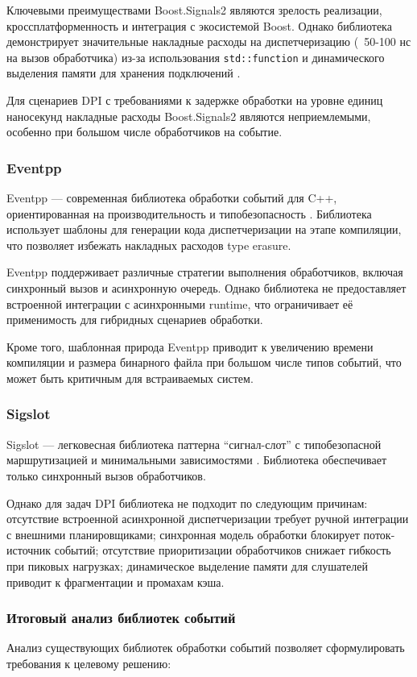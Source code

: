 Ключевыми преимуществами Boost.Signals2 являются зрелость реализации, кроссплатформенность и интеграция с экосистемой Boost.
Однако библиотека демонстрирует значительные накладные расходы на диспетчеризацию (~50-100 нс на вызов обработчика) из-за использования \texttt{std::function} и динамического выделения памяти для хранения подключений \cite{stroustrup2013cpp}.

Для сценариев DPI с требованиями к задержке обработки на уровне единиц наносекунд накладные расходы Boost.Signals2 являются неприемлемыми, особенно при большом числе обработчиков на событие.

\subsubsection{Eventpp}
Eventpp — современная библиотека обработки событий для C++, ориентированная на производительность и типобезопасность \cite{eventpp2023doc}.
Библиотека использует шаблоны для генерации кода диспетчеризации на этапе компиляции, что позволяет избежать накладных расходов type erasure.

Eventpp поддерживает различные стратегии выполнения обработчиков, включая синхронный вызов и асинхронную очередь. Однако библиотека не предоставляет встроенной интеграции с асинхронными runtime, что ограничивает её применимость для гибридных сценариев обработки.

Кроме того, шаблонная природа Eventpp приводит к увеличению времени компиляции и размера бинарного файла при большом числе типов событий, что может быть критичным для встраиваемых систем.

\subsubsection{Sigslot}
Sigslot — легковесная библиотека паттерна ``сигнал-слот'' с типобезопасной маршрутизацией и минимальными зависимостями \cite{sigslot_modern}. Библиотека обеспечивает только синхронный вызов обработчиков.

Однако для задач DPI библиотека не подходит по следующим причинам: отсутствие встроенной асинхронной диспетчеризации требует ручной интеграции с внешними планировщиками; синхронная модель обработки блокирует поток-источник событий; отсутствие приоритизации обработчиков снижает гибкость при пиковых нагрузках; динамическое выделение памяти для слушателей приводит к фрагментации и промахам кэша.

\subsubsection{Итоговый анализ библиотек событий}
Анализ существующих библиотек обработки событий позволяет сформулировать требования к целевому решению:

